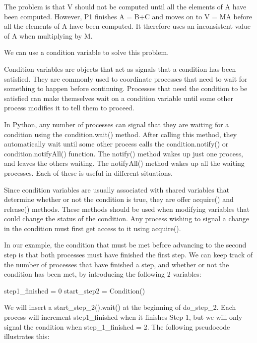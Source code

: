\documentclass[letterpaper,10pt,dvipdfmx]{sphinxmanual}
\begin{document}
The problem is that V should not be computed until all the elements of A have been computed. However, P1 finishes A = B+C and moves on to V = MA before all the elements of A have been computed. It therefore uses an inconsistent value of A when multiplying by M.

We can use a condition variable to solve this problem.

Condition variables are objects that act as signals that a condition has been satisfied. They are commonly used to coordinate processes that need to wait for something to happen before continuing. Processes that need the condition to be satisfied can make themselves wait on a condition variable until some other process modifies it to tell them to proceed.

In Python, any number of processes can signal that they are waiting for a condition using the condition.wait() method. After calling this method, they automatically wait until some other process calls the condition.notify() or condition.notifyAll() function. The notify() method wakes up just one process, and leaves the others waiting. The notifyAll() method wakes up all the waiting processes. Each of these is useful in different situations.

Since condition variables are usually associated with shared variables that determine whether or not the condition is true, they are offer acquire() and release() methods. These methods should be used when modifying variables that could change the status of the condition. Any process wishing to signal a change in the condition must first get access to it using acquire().

In our example, the condition that must be met before advancing to the second step is that both processes must have finished the first step. We can keep track of the number of processes that have finished a step, and whether or not the condition has been met, by introducing the following 2 variables:

step1\_finished = 0
start\_step2 = Condition()

We will insert a start\_step\_2().wait() at the beginning of do\_step\_2. Each process will increment step1\_finished when it finishes Step 1, but we will only signal the condition when step\_1\_finished = 2. The following pseudocode illustrates this:
\end{document}
